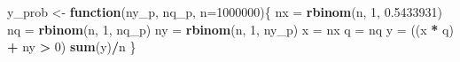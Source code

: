 \documentclass[]{article}
\newenvironment{Shaded}{\begin{snugshade}}{\end{snugshade}}
\newcommand{\KeywordTok}[1]{\textcolor[rgb]{0.13,0.29,0.53}{\textbf{#1}}}
\newcommand{\DataTypeTok}[1]{\textcolor[rgb]{0.13,0.29,0.53}{#1}}
\newcommand{\DecValTok}[1]{\textcolor[rgb]{0.00,0.00,0.81}{#1}}
\newcommand{\FloatTok}[1]{\textcolor[rgb]{0.00,0.00,0.81}{#1}}
\newcommand{\StringTok}[1]{\textcolor[rgb]{0.31,0.60,0.02}{#1}}
\newcommand{\ControlFlowTok}[1]{\textcolor[rgb]{0.13,0.29,0.53}{\textbf{#1}}}
\newcommand{\OperatorTok}[1]{\textcolor[rgb]{0.81,0.36,0.00}{\textbf{#1}}}
\newcommand{\NormalTok}[1]{#1}
\begin{document}
\begin{Shaded}
\begin{Highlighting}[]
\NormalTok{y_prob <-}\StringTok{ }\ControlFlowTok{function}\NormalTok{(ny_p, nq_p, }\DataTypeTok{n=}\DecValTok{1000000}\NormalTok{)\{}
\NormalTok{    nx =}\StringTok{ }\KeywordTok{rbinom}\NormalTok{(n, }\DecValTok{1}\NormalTok{, }\FloatTok{0.5433931}\NormalTok{)}
\NormalTok{    nq =}\StringTok{ }\KeywordTok{rbinom}\NormalTok{(n, }\DecValTok{1}\NormalTok{, nq_p)}
\NormalTok{    ny =}\StringTok{ }\KeywordTok{rbinom}\NormalTok{(n, }\DecValTok{1}\NormalTok{, ny_p)}
\NormalTok{    x =}\StringTok{ }\NormalTok{nx}
\NormalTok{    q =}\StringTok{ }\NormalTok{nq}
\NormalTok{    y =}\StringTok{ }\NormalTok{((x }\OperatorTok{*}\StringTok{ }\NormalTok{q) }\OperatorTok{+}\StringTok{ }\NormalTok{ny }\OperatorTok{>}\StringTok{ }\DecValTok{0}\NormalTok{)}
    \KeywordTok{sum}\NormalTok{(y)}\OperatorTok{/}\NormalTok{n}
\NormalTok{\}}
\end{Highlighting}
\end{Shaded}
\end{document}

